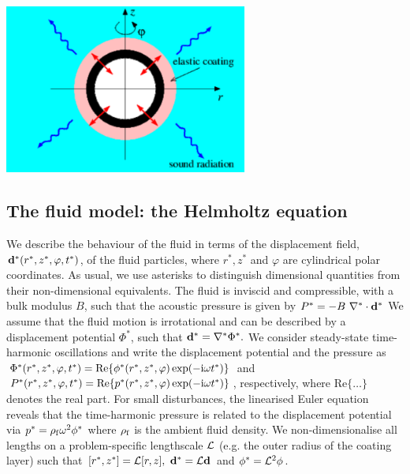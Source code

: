  
\begin{DoxyImage}
\includegraphics[width=0.6\textwidth]{coated_sphere}
\end{DoxyImage}
\hypertarget{index_fluid}{}\subsection{The fluid model\+: the Helmholtz equation}\label{index_fluid}
We describe the behaviour of the fluid in terms of the displacement field, $ {\bf d}^*(r^*,z^*,\varphi,t^*)$, of the fluid particles, where $r^*, z^* $ and $ \varphi $ are cylindrical polar coordinates. As usual, we use asterisks to distinguish dimensional quantities from their non-\/dimensional equivalents. The fluid is inviscid and compressible, with a bulk modulus $ B $, such that the acoustic pressure is given by $ P^* = - B \ \nabla^{*} \cdot {\bf d}^* $ We assume that the fluid motion is irrotational and can be described by a displacement potential $\Phi^*$, such that $ {\bf d}^*= \nabla^* \Phi^*. $ We consider steady-\/state time-\/harmonic oscillations and write the displacement potential and the pressure as $\Phi^*(r^*,z^*,\varphi,t^*) = \mbox{Re} \{\phi^*(r^*,z^*,\varphi) \exp(-{\rm i} \omega t^*)\} $ and $P^*(r^*,z^*,\varphi,t^*) = \mbox{Re}\{p^*(r^*,z^*,\varphi) \exp(-{\rm i} \omega t^*)\}$, respectively, where $\mbox{Re}\{\ldots \}$ denotes the real part. For small disturbances, the linearised Euler equation reveals that the time-\/harmonic pressure is related to the displacement potential via $ p^* = \rho_{\rm f} \omega^2 \phi^*$ where $ \rho_{\rm f}$ is the ambient fluid density. We non-\/dimensionalise all lengths on a problem-\/specific lengthscale $ {\cal L}$ (e.\+g. the outer radius of the coating layer) such that $ [r^*, z^*] = {\cal L} [r,z], \ {\bf d}^* = {\cal L} {\bf d} $ and $\phi^* = {\cal L}^2 \phi$.

